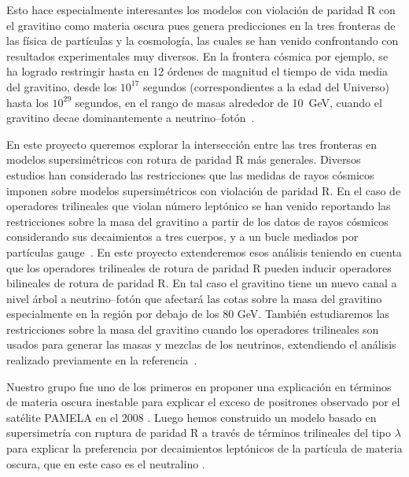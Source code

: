 Esto hace especialmente interesantes los modelos con violación de
paridad R con el gravitino como materia oscura pues genera
predicciones en la tres fronteras de las física de partículas y la
cosmología, las cuales se han venido confrontando con resultados
experimentales muy diversos. En la frontera cósmica por ejemplo, se ha
logrado restringir hasta en 12 órdenes de magnitud el tiempo de vida
media del gravitino, desde los $10^{17}$ segundos (correspondientes a
la edad del Universo) hasta los $10^{29}$ segundos, en el rango de
masas alrededor de 10~GeV, cuando el gravitino decae dominantemente a
neutrino--fotón~\cite{Vertongen:2011mu}.

\begin{gravitinodm}
  En este proyecto queremos explorar la intersección entre las tres
  fronteras en modelos supersimétricos con rotura de paridad R más
  generales.  Diversos estudios han considerado las restricciones que
  las medidas de rayos cósmicos imponen sobre modelos supersimétricos
  con violación de paridad R. En el caso de operadores trilineales que
  violan número leptónico se han venido reportando las restricciones
  sobre la masa del gravitino a partir de los datos de rayos cósmicos
  considerando sus decaimientos a tres cuerpos, y a un bucle mediados
  por partículas
  gauge~\cite{Lola:2007rw,Lola:2008bk,Bomark:2009zm}. En este proyecto
  extenderemos esos análisis teniendo en cuenta que los operadores
  trilineales de rotura de paridad R pueden inducir operadores
  bilineales de rotura de paridad R. En tal caso el gravitino tiene un
  nuevo canal a nivel árbol a neutrino--fotón que afectará las cotas
  sobre la masa del gravitino especialmente en la región por debajo de
  los 80 GeV. También estudiaremos las restricciones sobre la masa del
  gravitino cuando los operadores trilineales son usados para generar
  las masas y mezclas de los neutrinos, extendiendo el análisis
  realizado previamente en la referencia~\cite{Bajc:2010qj}.

  Nuestro grupo \cite{Nardi:2008ix} fue uno de los primeros en
  proponer una explicación en términos de materia oscura inestable
  para explicar el exceso de positrones observado por el satélite
  PAMELA en el 2008 \cite{Adriani:2008zr}. Luego hemos construido un
  modelo basado en supersimetría con ruptura de paridad R a través de
  términos trilineales del tipo $\lambda$ para explicar la preferencia
  por decaimientos leptónicos de la partícula de materia oscura, que
  en este caso es el neutralino \cite{Sierra:2009zq}.
\end{gravitinodm}

